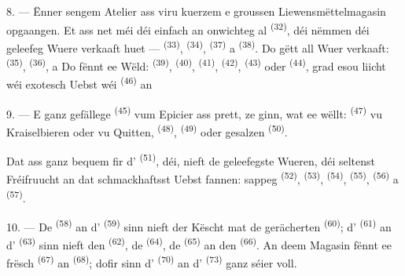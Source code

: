 \VUsaut{4.0mm}
\VUsaut{3.0mm}

8. --- Ënner sengem Atelier ass viru kuerzem e groussen Liewensmëttelmagasin
opgaangen. Et ass net méi déi einfach an onwichteg al 
\textsuperscript{(32)}, déi nëmmen déi geleefeg Wuere verkaaft huet ---
 \textsuperscript{(33)},  \textsuperscript{(34)},
 \textsuperscript{(37)} a 
\textsuperscript{(38)}. Do gëtt all Wuer verkaaft: 
 \textsuperscript{(35)},  \textsuperscript{(36)},
 a  Do fënnt ee Wëld:
 \textsuperscript{(39)},  \textsuperscript{(40)},
 \textsuperscript{(41)}, 
\textsuperscript{(42)},  \textsuperscript{(43)} oder
 \textsuperscript{(44)}, grad esou liicht wéi exotesch Uebst wéi
 \textsuperscript{(46)} an 

9. --- E ganz gefällege  \textsuperscript{(45)} vum Epicier ass prett,
ze ginn, wat ee wëllt:  \textsuperscript{(47)} vu Kraiselbieren oder
vu Quitten,  \textsuperscript{(48)}, 
\textsuperscript{(49)} oder gesalzen  \textsuperscript{(50)}.

Dat ass ganz bequem fir d' \textsuperscript{(51)}, déi, nieft de
geleefegste Wueren, déi seltenst Fréifruucht an dat schmackhaftsst Uebst fannen:
sappeg  \textsuperscript{(52)}, 
\textsuperscript{(53)},  \textsuperscript{(54)},
 \textsuperscript{(55)}, 
\textsuperscript{(56)} a  \textsuperscript{(57)}.

\VUsaut{4.0mm}
\VUsaut{3.0mm}

10. --- De  \textsuperscript{(58)} an d'
\textsuperscript{(59)} sinn nieft der Këscht mat de gerächerten 
\textsuperscript{(60)}; d' \textsuperscript{(61)} an
d' \textsuperscript{(63)} sinn nieft den 
\textsuperscript{(62)}, de  \textsuperscript{(64)}, de
 \textsuperscript{(65)} an den 
\textsuperscript{(66)}. An deem Magasin fënnt ee frësch 
\textsuperscript{(67)} an  \textsuperscript{(68)}; dofir sinn
d' \textsuperscript{(70)} an d'
\textsuperscript{(73)} ganz séier voll.

